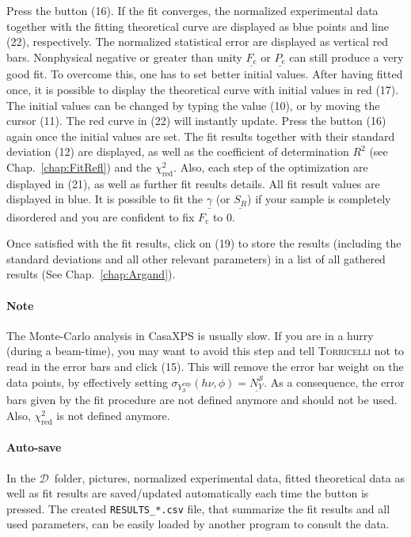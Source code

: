 \documentclass[oldfontcommands,openany,oneside]{memoir}
\newcommand{\dirData}[1]{{\fontsize{9}{0}\selectfont\faFolderOpenO$\mathcal{D}$}$\,${\fontsize{7}{0}\selectfont\faCaretRight}\directory{#1}}
\begin{document}
Press the  button (16). If the fit converges, the normalized experimental data together with the fitting theoretical curve are displayed as blue points and line (22), respectively. The normalized statistical error are displayed as vertical red bars. Nonphysical negative or greater than unity $\underline{F_\mathrm{c}}$ or $\underline{P_\mathrm{c}}$ can still produce a very good fit. To overcome this, one has to set better initial values. After having fitted once, it is possible to display the theoretical curve with initial values in red (17). The initial values can be changed by typing the value (10), or by moving the cursor (11). The red curve in (22) will instantly update. Press the  button (16) again once the initial values are set. The fit results together with their standard deviation (12) are displayed, as well as the coefficient of determination $R^2$ (see Chap.~\ref{chap:FitRefl}) and the $\chi_\mathrm{red}^2$. Also, each step of the optimization are displayed in (21), as well as further fit results details. All fit result values are displayed in blue. It is possible to fit the $\underline{\gamma}$ (or $\underline{S_R}$) if your sample is completely disordered and you are confident to fix $F_\mathrm{c}$ to 0.

Once satisfied with the fit results, click on  (19) to store the results (including the standard deviations and all other relevant parameters) in a list of all gathered results (See Chap.~\ref{chap:Argand}).


\paragraph{Note} The Monte-Carlo analysis in CasaXPS is usually slow. If you are in a hurry (during a beam-time), you may want to avoid this step and tell \textsc{Torricelli} not to read in the error bars and click  (15). This will remove the error bar weight on the data points, by effectively setting $\sigma_{Y^\mathrm{exp}_\mathscr{S}}(h\nu, \phi)=\underline{N_Y^\mathscr{S}}$. As a consequence, the error bars given by the fit procedure are not defined anymore and should not be used. Also, $\chi_\mathrm{red}^2$ is not defined anymore.

\paragraph{Auto-save} In the \dirData{results} folder, pictures, normalized experimental data, fitted theoretical data as well as fit results are saved/updated automatically each time the  button is pressed. The created \texttt{RESULTS\_*.csv} file, that summarize the fit results and all used parameters, can be easily loaded by another program to consult the data.
\end{document}
